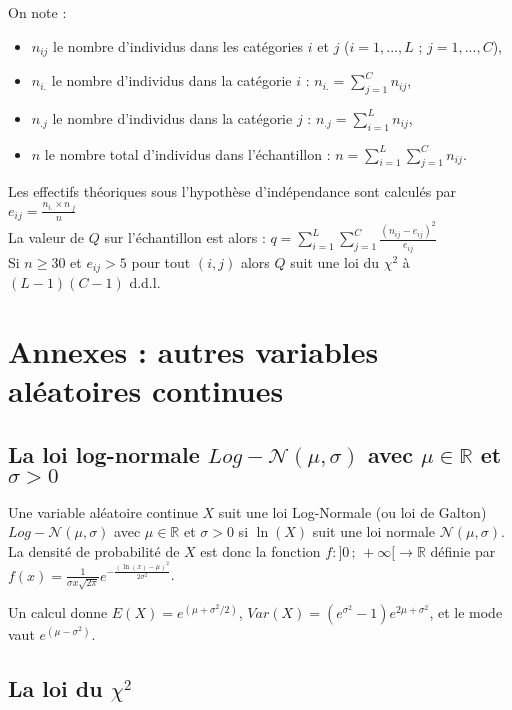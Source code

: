 \documentclass[12pt, a4paper]{article}
\begin{document}
\noindent On note : 
\begin{itemize}
\item[] $n_{ij}$ le nombre d'individus dans les catégories $i$ et $j$ ($i=1,..., L$ ; $j=1,..., C$), 
\item[] $n_{i.}$ le nombre d'individus dans la catégorie $i$ : $n_{i.} = \sum_{j=1}^C n_{ij}$,
\item[] $n_{.j}$ le nombre d'individus dans la catégorie $j$ : $n_{.j} = \sum_{i=1}^L n_{ij}$,
\item[] $n$ le nombre total d'individus dans l'échantillon : $n = \sum_{i=1}^L \sum_{j=1}^C n_{ij}$.
\end{itemize}
Les effectifs théoriques sous l'hypothèse d'indépendance sont calculés par 
$\displaystyle e_{ij} = \frac{n_{i.} \times n_{.j}}{n}$ \\

La valeur de $Q$ sur l'échantillon est alors : \;\;
$
\displaystyle q=\sum_{i=1}^L \sum_{j=1}^C \frac{(n_{ij}- e_{ij})^2}{e_{ij}}
$ \\

Si $n\geq 30$ et $e_{ij} > 5$ pour tout $(i,j)$ alors $Q$ suit une 
loi du $\chi^2$ à $(L-1)(C-1)$ d.d.l.

\section{Annexes : autres variables aléatoires continues}

\subsection[Loi log-normale]{La loi log-normale $Log-\mathcal{N}(\mu,\sigma)$ avec $\mu\in \mathbb{R}$ et $\sigma>0$}

Une variable aléatoire continue $X$ suit une loi Log-Normale (ou loi de Galton) 
$Log-\mathcal{N}(\mu,\sigma)$ avec $\mu\in \mathbb{R}$ et $\sigma>0$ si $\ln(X)$ suit une loi normale $\mathcal{N}(\mu,\sigma)$.
La densité de probabilité de $X$ est donc la fonction 
$f : ]0\,;\,+\infty[ \longrightarrow \mathbb{R}$ définie par  
$f(x)=\frac{1}{\sigma x\sqrt{2\pi}} e^{-\frac{(\ln (x) -\mu)^2}{2\sigma^2}}$.

Un calcul donne $E(X)=e^{(\mu+\sigma^2/2)}$,  $Var(X)=(e^{\sigma^2}-1) e^{2\mu+\sigma^2}$, et le mode vaut $e^{(\mu-\sigma^2)}$.

\subsection[Loi du chi-2]{La loi du $\chi^2$}
\end{document}
